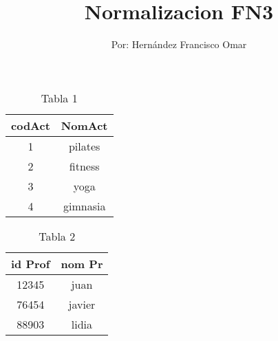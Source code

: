 \documentclass[letterpaper,12pt]{article}
\title{\textbf{Normalizacion FN3}}
\author{Por: Hernández Francisco Omar }
\begin{document}
\maketitle

    \begin{table}[h!]
        \begin{center}
        \begin{tabular}{|c|c|}
        \hline
        \textbf{codAct}&\textbf{NomAct}\\
        \hline
        1 & pilates \\\hline
        2 & fitness \\\hline
        3 & yoga \\\hline
        4 & gimnasia \\
        \hline
        \end{tabular}
        \end{center}
    \caption{Tabla 1}
    \end{table}
   
   \begin{table}[h!]
        \begin{center}
        \begin{tabular}{|c|c|}
        \hline
        \textbf{id Prof }&\textbf{ nom Pr }\\
        \hline
        12345 & juan \\\hline
        76454 & javier \\\hline
        88903 & lidia \\\hline
        \end{tabular}
        \end{center}
        \caption{Tabla 2}
    \end{table}
    
\end{document}

